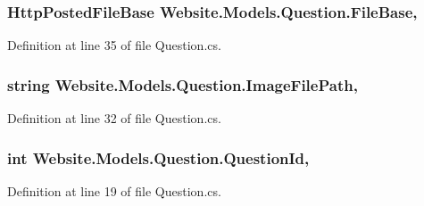 \subsubsection[{File\+Base}]{\setlength{\rightskip}{0pt plus 5cm}Http\+Posted\+File\+Base Website.\+Models.\+Question.\+File\+Base\hspace{0.3cm}{\ttfamily [get]}, {\ttfamily [set]}}\label{class_website_1_1_models_1_1_question_a40001ac043de6efc0f89ecb9422980b5}


Definition at line 35 of file Question.\+cs.

\hypertarget{class_website_1_1_models_1_1_question_ae118b3710c213f806b9e2618136a9de1}{}
\subsubsection[{Image\+File\+Path}]{\setlength{\rightskip}{0pt plus 5cm}string Website.\+Models.\+Question.\+Image\+File\+Path\hspace{0.3cm}{\ttfamily [get]}, {\ttfamily [set]}}\label{class_website_1_1_models_1_1_question_ae118b3710c213f806b9e2618136a9de1}


Definition at line 32 of file Question.\+cs.

\hypertarget{class_website_1_1_models_1_1_question_ae38fdbaceb7dbdf048af25503637efe2}{}
\subsubsection[{Question\+Id}]{\setlength{\rightskip}{0pt plus 5cm}int Website.\+Models.\+Question.\+Question\+Id\hspace{0.3cm}{\ttfamily [get]}, {\ttfamily [set]}}\label{class_website_1_1_models_1_1_question_ae38fdbaceb7dbdf048af25503637efe2}


Definition at line 19 of file Question.\+cs.

\hypertarget{class_website_1_1_models_1_1_question_a08bdca8c44c01af0f79f80a7f41ad459}{}
